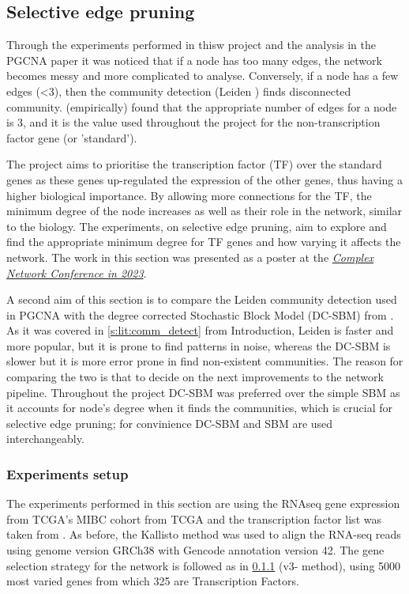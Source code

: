 \subsection{Selective edge pruning} \label{s:sel_pruning}

Through the experiments performed in thisw project and the analysis in the PGCNA paper \cite{Care2019-ij} it was noticed that if a node has too many edges, the network becomes messy and more complicated to analyse. Conversely, if a node has a few edges (<3), then the community detection (Leiden \citet{Traag2019-ne}) finds disconnected community. \cite{Care2019-ij} (empirically) found that the appropriate number of edges for a node is 3, and it is the value used throughout the project for the non-transcription factor gene (or 'standard'). 

The project aims to prioritise the transcription factor (TF) over the standard genes as these genes up-regulated the expression of the other genes, thus having a higher biological importance. By allowing more connections for the TF, the minimum degree of the node increases as well as their role in the network, similar to the biology. The experiments, on selective edge pruning, aim to explore and find the appropriate minimum degree for TF genes and how varying it affects the network. The work in this section was presented as a poster at the \textit{\href{https://2023.complexnetworks.org/}{Complex Network Conference in 2023}}.

A second aim of this section is to compare the Leiden \citet{Traag2019-ne} community detection used in PGCNA with the degree corrected Stochastic Block Model (DC-SBM) from \cite{Karrer2011-si, Peixoto2017-gc}. As it was covered in \cref{s:lit:comm_detect} from Introduction, Leiden is faster and more popular, but it is prone to find patterns in noise, whereas the DC-SBM is slower but it is more error prone in find non-existent communities. The reason for comparing the two is that to decide on the next improvements to the network pipeline. Throughout the project DC-SBM was preferred over the simple SBM \cite{Holland1983-eu} as it accounts for node's degree when it finds the communities, which is crucial for selective edge pruning; for convinience DC-SBM and SBM are used interchangeably.

\subsubsection{Experiments setup}


The experiments performed in this section are using the RNAseq gene expression from TCGA's MIBC cohort from TCGA and the transcription factor list was taken from \citet{Lambert2018-el}. As before, the Kallisto method was used to align the RNA-seq reads using genome version GRCh38 with Gencode annotation version 42. The gene selection strategy for the network is followed as in \ref{} (v3- method), using 5000 most varied genes from which 325 are Transcription Factors.


